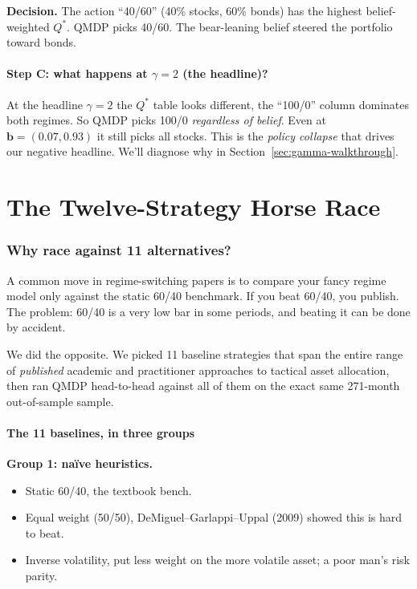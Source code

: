 \documentclass[11pt]{article}
\newcommand{\bel}{\mathbf{b}}
\begin{document}
\textbf{Decision.} The action ``40/60'' (40\% stocks, 60\% bonds) has the highest belief-weighted $Q^*$. QMDP picks 40/60. The bear-leaning belief steered the portfolio toward bonds.

\subsection{Step C: what happens at $\gamma = 2$ (the headline)?}

At the headline $\gamma = 2$ the $Q^*$ table looks different, the ``100/0'' column dominates both regimes. So QMDP picks 100/0 \emph{regardless of belief}. Even at $\bel = (0.07, 0.93)$ it still picks all stocks. This is the \emph{policy collapse} that drives our negative headline. We'll diagnose why in Section~\ref{sec:gamma-walkthrough}.

\part{The Twelve-Strategy Horse Race}

\section{Why race against 11 alternatives?}

A common move in regime-switching papers is to compare your fancy regime model only against the static 60/40 benchmark. If you beat 60/40, you publish. The problem: 60/40 is a very low bar in some periods, and beating it can be done by accident.

We did the opposite. We picked 11 baseline strategies that span the entire range of \emph{published} academic and practitioner approaches to tactical asset allocation, then ran QMDP head-to-head against all of them on the exact same 271-month out-of-sample sample.

\subsection{The 11 baselines, in three groups}

\textbf{Group 1: na\"ive heuristics.}
\begin{itemize}
  \item Static 60/40, the textbook bench.
  \item Equal weight (50/50), DeMiguel--Garlappi--Uppal (2009) showed this is hard to beat.
  \item Inverse volatility, put less weight on the more volatile asset; a poor man's risk parity.
\end{itemize}
\end{document}
